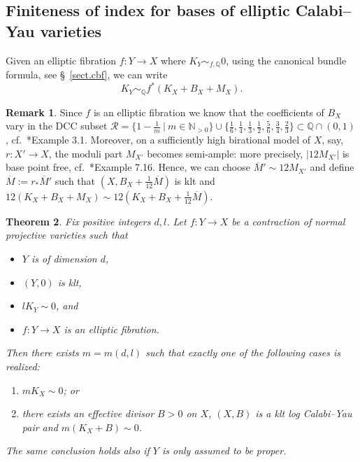 \documentclass[11pt]{ip-journal}
\newtheorem{theorem}{Theorem}[section]
\theoremstyle{definition}
\newtheorem{remark}[theorem]{Remark}
\begin{document}
\subsection{Finiteness of index for bases of elliptic Calabi--Yau varieties}

Given an elliptic fibration $f \colon Y \to X$ where $K_Y \sim_{f, \mathbb{Q}} 0$, using the canonical bundle formula, see \S~\ref{sect.cbf}, we can write
\[
K_Y \sim_{\mathbb{Q}} f^\ast (K_{X}+B_{X}+M_{X}). 
\]
\begin{remark}
\label{rmk.coeff.ell.fibr}
Since 
$f$ 
is an elliptic fibration we know that the coefficients of 
$B_{X}$ 
vary in the DCC subset 
$\mathcal R = \{1-\frac1m \ \vert \ m \in \mathbb N_{>0}\} \cup \{ \frac 16, \frac 14, \frac 13, \frac 12, \frac 56, \frac 34, \frac 23\} \subset \mathbb Q \cap (0,1)$, 
cf.~\cite{MR2448282}*{Example 3.1}. 
Moreover, on a sufficiently high birational model of $X$, say, $r \colon X' \to X$, the moduli part $M_{X'}$ becomes semi-ample: more precisely, $|12M_{X'}|$ is base point free, cf.~\cite{MR2448282}*{Example 7.16}.
Hence, we can choose $\overline{M}' \sim 12 M_{X'}$ and define $\overline{M} := r_\ast \overline{M}'$ such that $(X, B_{X} + \frac 1 {12} \overline{M})$ is klt and $12(K_{X}+B_{X}+M_{X}) \sim 12(K_{X} + B_{X} + \frac{1}{12} \overline{M})$.
\end{remark}


\begin{theorem}\label{index.fibr.thm}
Fix positive integers $d, l$.
Let $f \colon Y \to X$ be a contraction of normal projective varieties  such that
\begin{itemize}
    \item $Y$ is of dimension $d$,
    \item $(Y, 0)$ is klt,
    \item $lK_Y \sim 0$, and
    \item $f \colon Y \to X$ is an elliptic fibration.
\end{itemize}
Then there exists $m=m(d, l)$ such that exactly one of the following cases is realized:
\begin{enumerate}
\item[(a)] $mK_X \sim 0$; or
\item[(b)] there exists an effective divisor $B>0$ on $X$, $(X, B)$ is a klt log Calabi--Yau pair and $m(K_X+B) \sim 0$.
\end{enumerate}

The same conclusion holds also if 
$Y$
is only assumed to be proper.

\end{theorem}
\end{document}
